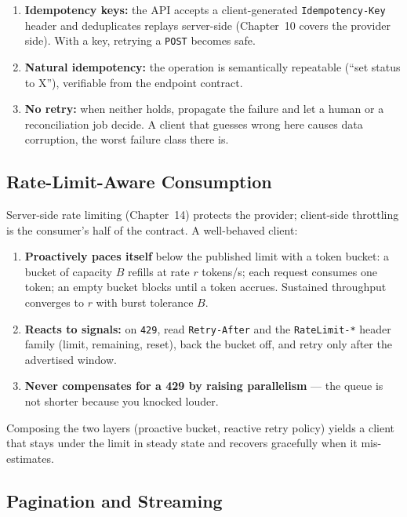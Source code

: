 \begin{enumerate}
  \item \textbf{Idempotency keys:} the API accepts a client-generated
        \texttt{Idempotency-Key} header and deduplicates replays server-side
        (Chapter~10 covers the provider side). With a key, retrying a
        \texttt{POST} becomes safe.
  \item \textbf{Natural idempotency:} the operation is semantically
        repeatable (``set status to X''), verifiable from the endpoint
        contract.
  \item \textbf{No retry:} when neither holds, propagate the failure and let
        a human or a reconciliation job decide. A client that guesses wrong
        here causes data corruption, the worst failure class there is.
\end{enumerate}

\subsection{Rate-Limit-Aware Consumption}
\label{sec:ch02-ratelimit}

Server-side rate limiting (Chapter~14) protects the provider; client-side
throttling is the consumer's half of the contract. A well-behaved client:

\begin{enumerate}
  \item \textbf{Proactively paces itself} below the published limit with a
        token bucket: a bucket of capacity $B$ refills at rate $r$ tokens/s;
        each request consumes one token; an empty bucket blocks until a token
        accrues. Sustained throughput converges to $r$ with burst tolerance
        $B$.
  \item \textbf{Reacts to signals:} on \texttt{429}, read \texttt{Retry-After}
        and the \texttt{RateLimit-*} header family (limit, remaining, reset),
        back the bucket off, and retry only after the advertised window.
  \item \textbf{Never compensates for a 429 by raising parallelism} --- the
        queue is not shorter because you knocked louder.
\end{enumerate}

Composing the two layers (proactive bucket, reactive retry policy) yields a
client that stays under the limit in steady state and recovers gracefully when
it mis-estimates.

\subsection{Pagination and Streaming}
\label{sec:ch02-pagination}

